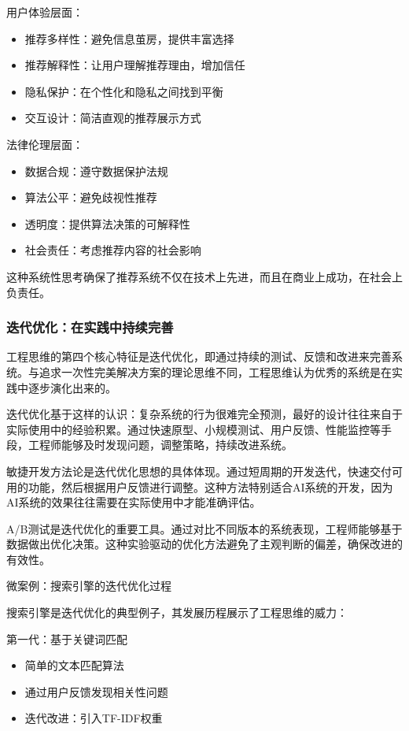 用户体验层面：
\begin{itemize}
\item 推荐多样性：避免信息茧房，提供丰富选择
\item 推荐解释性：让用户理解推荐理由，增加信任
\item 隐私保护：在个性化和隐私之间找到平衡
\item 交互设计：简洁直观的推荐展示方式
\end{itemize}

法律伦理层面：
\begin{itemize}
\item 数据合规：遵守数据保护法规
\item 算法公平：避免歧视性推荐
\item 透明度：提供算法决策的可解释性
\item 社会责任：考虑推荐内容的社会影响
\end{itemize}

这种系统性思考确保了推荐系统不仅在技术上先进，而且在商业上成功，在社会上负责任。

\subsubsection{迭代优化：在实践中持续完善}

工程思维的第四个核心特征是迭代优化，即通过持续的测试、反馈和改进来完善系统。与追求一次性完美解决方案的理论思维不同，工程思维认为优秀的系统是在实践中逐步演化出来的。

迭代优化基于这样的认识：复杂系统的行为很难完全预测，最好的设计往往来自于实际使用中的经验积累。通过快速原型、小规模测试、用户反馈、性能监控等手段，工程师能够及时发现问题，调整策略，持续改进系统。

敏捷开发方法论是迭代优化思想的具体体现。通过短周期的开发迭代，快速交付可用的功能，然后根据用户反馈进行调整。这种方法特别适合AI系统的开发，因为AI系统的效果往往需要在实际使用中才能准确评估。

A/B测试是迭代优化的重要工具。通过对比不同版本的系统表现，工程师能够基于数据做出优化决策。这种实验驱动的优化方法避免了主观判断的偏差，确保改进的有效性。

微案例：搜索引擎的迭代优化过程

搜索引擎是迭代优化的典型例子，其发展历程展示了工程思维的威力：

第一代：基于关键词匹配
\begin{itemize}
\item 简单的文本匹配算法
\item 通过用户反馈发现相关性问题
\item 迭代改进：引入TF-IDF权重
\end{itemize}

